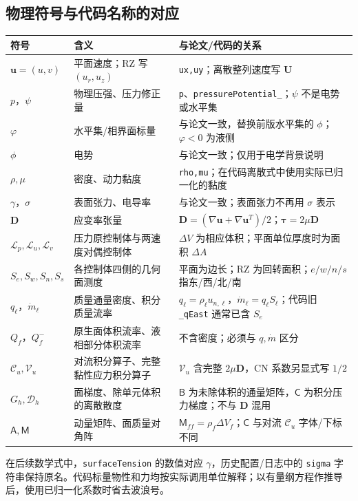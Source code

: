 \documentclass[UTF8,a4paper,11pt,fontset=fandol]{ctexart}
\newcommand{\code}[1]{\nolinkurl{#1}}
\newcommand{\UU}{\bm{U}}
\newcommand{\vel}{\bm{u}}
\newcommand{\mat}[1]{\mathsf{#1}}
\begin{document}
\subsection{物理符号与代码名称的对应}
\begin{longtable}{@{}p{}p{}p{}@{}}
\toprule 符号 & 含义 & 与论文/代码的关系\\\midrule\endhead
$\vel=(u,v)$ & 平面速度；RZ 写 $(u_r,u_z)$ & \code{ux,uy}；离散整列速度写 $\UU$\\
$p$，$\psi$ & 物理压强、压力修正量 & \code{p}、\code{pressurePotential_}；$\psi$ 不是电势或水平集\\
$\varphi$ & 水平集/相界面标量 & 与论文一致，替换前版水平集的 $\phi$；$\varphi<0$ 为液侧\\
$\phi$ & 电势 & 与论文一致；仅用于电学背景说明\\
$\rho,\mu$ & 密度、动力黏度 & \code{rho,mu}；在代码离散式中使用实际已归一化的黏度\\
$\gamma$，$\sigma$ & 表面张力、电导率 & 与论文一致；表面张力不再用 $\sigma$ 表示\\
$\bm D$ & 应变率张量 & $\bm D=(\nabla\vel+\nabla\vel^T)/2$；$\bm\tau=2\mu\bm D$\\
$\mathcal L_p,\mathcal L_u,\mathcal L_v$ & 压力原控制体与两速度对偶控制体 & $\Delta V$ 为相应体积；平面单位厚度时为面积 $\Delta A$\\
$S_e,S_w,S_n,S_s$ & 各控制体四侧的几何面测度 & 平面为边长；RZ 为回转面积；$e/w/n/s$ 指东/西/北/南\\
$q_\ell$，$\dot m_\ell$ & 质量通量密度、积分质量流率 & $q_\ell=\rho_\ell u_{n,\ell}$，$\dot m_\ell=q_\ell S_\ell$；代码旧 \code{_qEast} 通常已含 $S_e$\\
$Q_f$，$Q_f^-$ & 原生面体积流率、液相部分体积流率 & 不含密度；必须与 $q,\dot m$ 区分\\
$\mathcal C_u,\mathcal V_u$ & 对流积分算子、完整黏性应力积分算子 & $\mathcal V_u$ 含完整 $2\mu\bm D$，CN 系数另显式写 $1/2$\\
$G_h,\mathcal D_h$ & 面梯度、除单元体积的离散散度 & $\mat B$ 为未除体积的通量矩阵，$\mat C$ 为积分压力梯度；不与 $\bm D$ 混用\\
$\mat A,\mat M$ & 动量矩阵、面质量对角阵 & $\mat M_{ff}=\rho_f\Delta V_f$；$\mat C$ 与对流 $\mathcal C_u$ 字体/下标不同\\
\bottomrule
\end{longtable}
在后续数学式中，\code{surfaceTension} 的数值对应 $\gamma$，历史配置/日志中的 \code{sigma} 字符串保持原名。代码标量物性和力均按实际调用单位解释；以有量纲方程作推导后，使用已归一化系数时省去波浪号。
\end{document}
